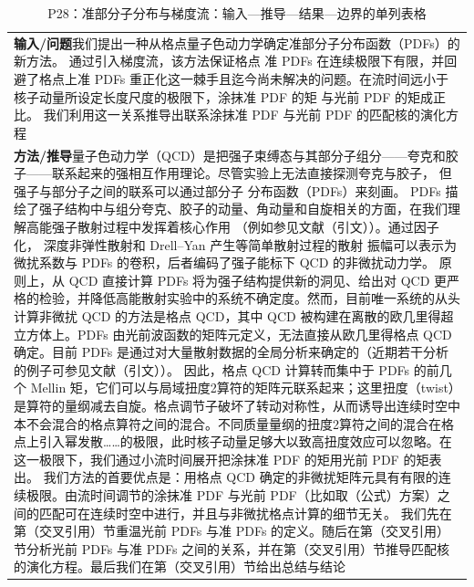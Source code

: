 \documentclass[UTF8,11pt,oneside]{ctexbook}
\begin{document}
\begin{table}[htbp]
  \centering
  \caption*{P28：准部分子分布与梯度流：输入—推导—结果—边界的单列表格}
  \small
  \begin{tabular}{@{}p{}@{}}
    \toprule
    \textbf{输入/问题}\quad 我们提出一种从格点量子色动力学确定准部分子分布函数（PDFs）的新方法。 通过引入梯度流，该方法保证格点 准 PDFs 在连续极限下有限，并回避了格点上准 PDFs 重正化这一棘手且迄今尚未解决的问题。在流时间远小于核子动量所设定长度尺度的极限下，涂抹准 PDF 的矩 与光前 PDF 的矩成正比。 我们利用这一关系推导出联系涂抹准 PDF 与光前 PDF 的匹配核的演化方程 \\
    \textbf{方法/推导}\quad 量子色动力学（QCD）是把强子束缚态与其部分子组分——夸克和胶子——联系起来的强相互作用理论。尽管实验上无法直接探测夸克与胶子， 但强子与部分子之间的联系可以通过部分子 分布函数（PDFs）来刻画。 PDFs 描绘了强子结构中与组分夸克、胶子的动量、角动量和自旋相关的方面，在我们理解高能强子散射过程中发挥着核心作用 （例如参见文献（引文））。通过因子化， 深度非弹性散射和 Drell–Yan 产生等简单散射过程的散射 振幅可以表示为微扰系数与 PDFs 的卷积，后者编码了强子能标下 QCD 的非微扰动力学。 原则上，从 QCD 直接计算 PDFs 将为强子结构提供新的洞见、给出对 QCD 更严格的检验，并降低高能散射实验中的系统不确定度。然而，目前唯一系统的从头计算非微扰 QCD 的方法是格点 QCD，其中 QCD 被构建在离散的欧几里得超立方体上。PDFs 由光前波函数的矩阵元定义，无法直接从欧几里得格点 QCD 确定。目前 PDFs 是通过对大量散射数据的全局分析来确定的（近期若干分析的例子可参见文献（引文））。 因此，格点 QCD 计算转而集中于 PDFs 的前几个 Mellin 矩，它们可以与局域扭度2算符的矩阵元联系起来；这里扭度（twist）是算符的量纲减去自旋。格点调节子破坏了转动对称性，从而诱导出连续时空中本不会混合的格点算符之间的混合。不同质量量纲的扭度2算符之间的混合在格点上引入幂发散……的极限，此时核子动量足够大以致高扭度效应可以忽略。在这一极限下，我们通过小流时间展开把涂抹准 PDF 的矩用光前 PDF 的矩表出。 我们方法的首要优点是：用格点 QCD 确定的非微扰矩阵元具有有限的连续极限。由流时间调节的涂抹准 PDF 与光前 PDF（比如取（公式）方案）之间的匹配可在连续时空中进行，并且与非微扰格点计算的细节无关。 我们先在第（交叉引用）节重温光前 PDFs 与准 PDFs 的定义。随后在第（交叉引用）节分析光前 PDFs 与准 PDFs 之间的关系，并在第（交叉引用）节推导匹配核的演化方程。最后我们在第（交叉引用）节给出总结与结论 \\

\end{tabular}
\end{table}
\end{document}
